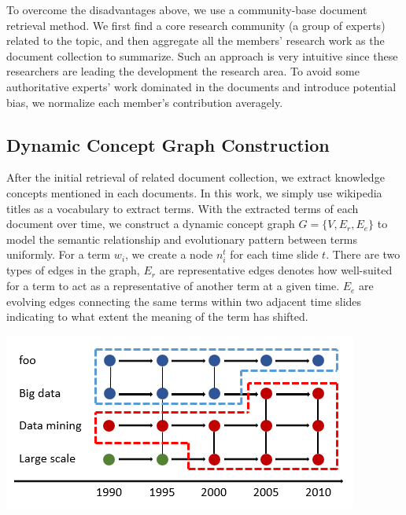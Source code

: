 To overcome the disadvantages above, we use a community-base document retrieval method. We first find a core research community (a group of experts) related to the topic, and then aggregate all the members' research work as the document collection to summarize. Such an approach is very intuitive since these researchers are leading the development the research area. To avoid some authoritative experts' work dominated in the documents and introduce potential bias, we normalize each member's contribution averagely.

\subsection{Dynamic Concept Graph Construction}
After the initial retrieval of related document collection, we extract knowledge concepts mentioned in each documents. In this work, we simply use wikipedia titles as a vocabulary to extract terms. With the extracted terms of each document over time, we construct a dynamic concept graph $G=\{V,E_r,E_e\}$ to model the semantic relationship and evolutionary pattern between terms uniformly. For a term $w_i$, we create a node $n_i^t$ for each time slide $t$. There are two types of edges in the graph, $E_r$ are representative edges denotes how well-suited for a term to act as a representative of another term at a given time. $E_e$ are evolving edges connecting the same terms within two adjacent time slides indicating to what extent the meaning of the term has shifted.

\begin{center}
\includegraphics[width=0.80\linewidth]{figures/mutual.png}
\end{center}


